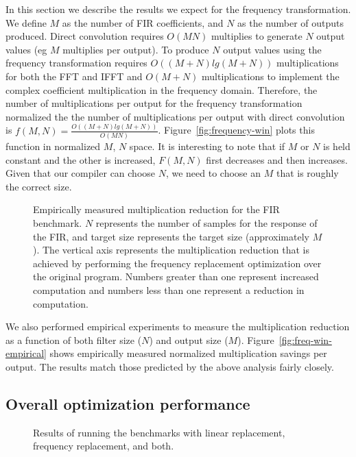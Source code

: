 In this section we describe the results we expect for the frequency transformation. We
define $M$ as the number of FIR coefficients, and $N$ as the number of outputs produced. Direct 
convolution requires $O(MN)$ multiplies to generate $N$ output values 
(eg $M$ multiplies per output). To produce $N$ output values using the frequency transformation 
requires $O((M+N)lg(M+N))$ multiplications for both the FFT and IFFT and $O(M+N)$ 
multiplications to implement the complex coefficient multiplication in the frequency domain.
Therefore, the number of multiplications per output for the frequency transformation
normalized the the number of multiplications per output with direct convolution is
$f(M,N)=\frac{O((M+N)lg(M+N))}{O(MN)}$. Figure~\ref{fig:frequency-win} plots this function
in normalized $M$, $N$ space. It is interesting to note that if $M$ or $N$ is held constant 
and the other is increased, $F(M,N)$ first decreases and then increases. Given that our compiler
can choose $N$, we need to choose an $M$ that is roughly the correct size.

\begin{figure}
\center
\epsfxsize=3.0in
\caption{Empirically measured multiplication reduction for the FIR benchmark. $N$ represents the number of samples for the response of the FIR, and target size represents the target size (approximately $M$). The vertical axis represents the multiplication reduction that is achieved by performing the frequency replacement optimization over the original program. Numbers greater than one represent increased computation and numbers less than one represent a reduction in computation. }
\label{fig:frequency-win-empirical}
\end{figure}


We also performed empirical experiments to measure the multiplication reduction
as a function of both filter size ($N$) and output size ($M$). 
Figure~\ref{fig:freq-win-empirical} shows empirically measured normalized 
multiplication savings per output. The results match those predicted by the 
above analysis fairly closely.


\subsection{Overall optimization performance}

\begin{figure}
\center
\epsfxsize=3.0in
\caption{Results of running the benchmarks with linear replacement, frequency replacement, and both.}
\label{fig:linear-freq-both}
\end{figure}

